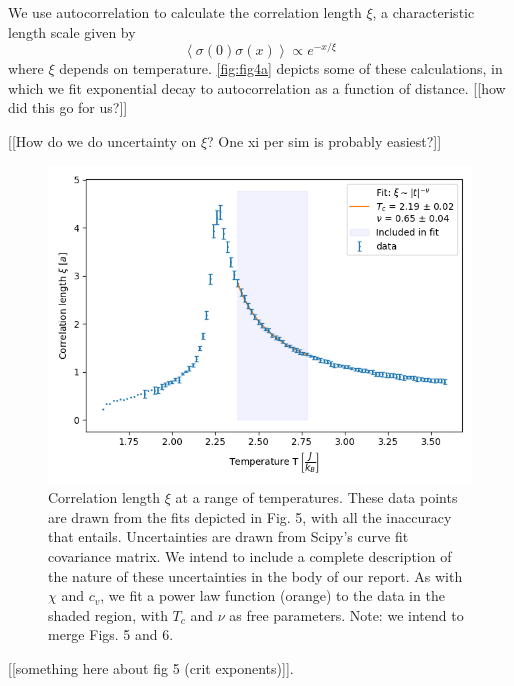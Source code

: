 \documentclass[letter,scriptaddress,twocolumn, prl,nofootinbib]{revtex4}
\newcommand{\submin}[1]{\left\langle #1 \right\rangle}
\begin{document}
We use autocorrelation to calculate the correlation length $\xi$, a characteristic length scale given by
\begin{equation}
	\label{eq:xi}
	\submin{\sigma(0)\sigma(x)} \propto e^{-x/\xi}
\end{equation}
where $\xi$ depends on temperature. \autoref{fig:fig4a} depicts some of these calculations, in which we fit exponential decay to autocorrelation as a function of distance. [[how did this go for us?]]

[[How do we do uncertainty on $\xi$? One xi per sim is probably easiest?]]

\begin{figure}[h]
	\begin{center}
		\includegraphics[width=.4\textwidth]{figs/fig4_xi.png}
		\caption{Correlation length $\xi$ at a range of temperatures. These data points are drawn from the fits depicted in Fig. 5, with all the inaccuracy that entails. Uncertainties are drawn from Scipy's curve fit covariance matrix. We intend to include a complete description of the nature of these uncertainties in the body of our report. As with $\chi$ and $c_v$, we fit a power law function (orange) to the data in the shaded region, with $T_c$ and $\nu$ as free parameters. Note: we intend to merge Figs. 5 and 6.}
		\label{fig:fig4b}
	\end{center}
\end{figure}

[[something here about fig 5 (crit exponents)]].
\end{document}
